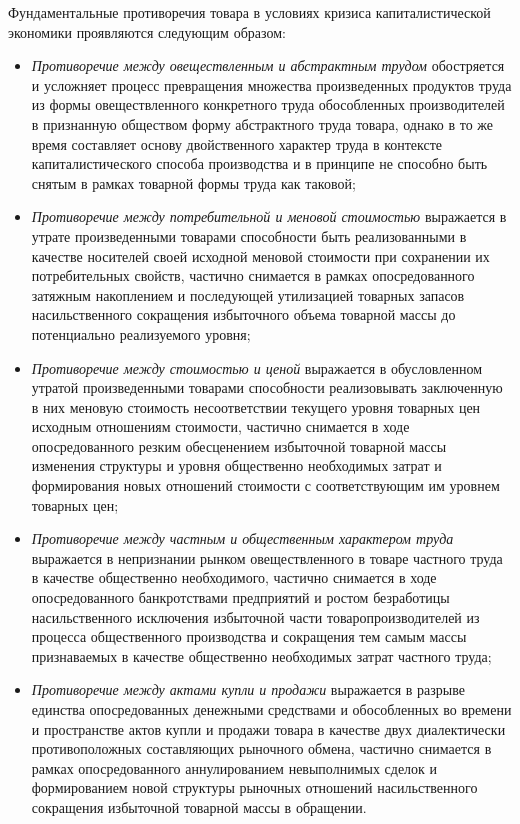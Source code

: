Фундаментальные противоречия товара в условиях кризиса капиталистической экономики проявляются следующим образом:
\begin{itemize}
    \item \textit{Противоречие между овеществленным и абстрактным трудом} обостряется и усложняет процесс превращения множества произведенных продуктов труда из формы овеществленного конкретного труда обособленных производителей в признанную обществом форму абстрактного труда товара, однако в то же время составляет основу двойственного характер труда в контексте капиталистического способа производства и в принципе не способно быть снятым в рамках товарной формы труда как таковой;
    \item \textit{Противоречие между потребительной и меновой стоимостью} выражается в утрате произведенными товарами способности быть реализованными в качестве носителей своей исходной меновой стоимости при сохранении их потребительных свойств, частично снимается в рамках опосредованного затяжным накоплением и последующей утилизацией товарных запасов насильственного сокращения избыточного объема товарной массы до потенциально реализуемого уровня;
    \item \textit{Противоречие между стоимостью и ценой} выражается в обусловленном утратой произведенными товарами способности реализовывать заключенную в них меновую стоимость несоответствии текущего уровня товарных цен исходным отношениям стоимости, частично снимается в ходе опосредованного резким обесценением избыточной товарной массы изменения структуры и уровня общественно необходимых затрат и формирования новых отношений стоимости с соответствующим им уровнем товарных цен;
    \item \textit{Противоречие между частным и общественным характером труда} выражается в непризнании рынком овеществленного в товаре частного труда в качестве общественно необходимого, частично снимается в ходе опосредованного банкротствами предприятий и ростом безработицы насильственного исключения избыточной части товаропроизводителей из процесса общественного производства и сокращения тем самым массы признаваемых в качестве общественно необходимых затрат частного труда;
    \item \textit{Противоречие между актами купли и продажи} выражается в разрыве единства опосредованных денежными средствами и обособленных во времени и пространстве актов купли и продажи товара в качестве двух диалектически противоположных составляющих рыночного обмена, частично снимается в рамках опосредованного аннулированием невыполнимых сделок и формированием новой структуры рыночных отношений насильственного сокращения избыточной товарной массы в обращении.
\end{itemize}

